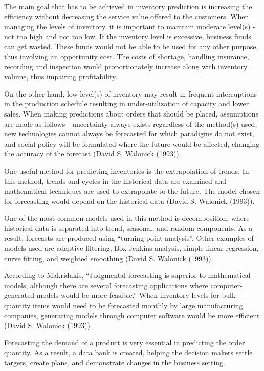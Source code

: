 \documentclass[]{elsarticle} %
\begin{document}
The main goal that has to be achieved in inventory prediction is
increasing the efficiency without decreasing the service value offered
to the customers. When managing the levels of inventory, it is important
to maintain moderate level(s) - not too high and not too low. If the
inventory level is excessive, business funds can get wasted. These funds
would not be able to be used for any other purpose, thus involving an
opportunity cost. The costs of shortage, handling insurance, recording
and inspection would proportionately increase along with inventory
volume, thus impairing profitability.

On the other hand, low level(s) of inventory may result in frequent
interruptions in the production schedule resulting in under-utilization
of capacity and lower sales. When making predictions about orders that
should be placed, assumptions are made as follows - uncertainty always
exists regardless of the method(s) used, new technologies cannot always
be forecasted for which paradigms do not exist, and social policy will
be formulated where the future would be affected, changing the accuracy
of the forecast (David S. Walonick (1993)).

One useful method for predicting inventories is the extrapolation of
trends. In this method, trends and cycles in the historical data are
examined and mathematical techniques are used to extrapolate to the
future. The model chosen for forecasting would depend on the historical
data (David S. Walonick (1993)).

One of the most common models used in this method is decomposition,
where historical data is separated into trend, seasonal, and random
components. As a result, forecasts are produced using ``turning point
analysis''. Other examples of models used are adaptive filtering,
Box-Jenkins analysis, simple linear regression, curve fitting, and
weighted smoothing (David S. Walonick (1993)).

According to Makridakis, ``Judgmental forecasting is superior to
mathematical models, although there are several forecasting applications
where computer-generated models would be more feasible.'' When inventory
levels for bulk-quantity items would need to be forecasted monthly by
large manufacturing companies, generating models through computer
software would be more efficient (David S. Walonick (1993)).

Forecasting the demand of a product is very essential in predicting the
order quantity. As a result, a data bank is created, helping the
decision makers settle targets, create plans, and demonstrate changes in
the business setting.
\end{document}
